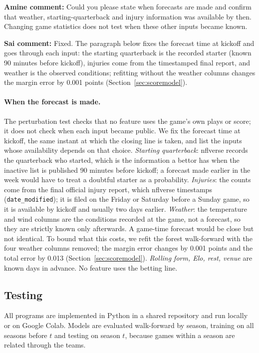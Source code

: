 {\color{red}\textbf{Amine comment:} Could you please state when forecasts are made and confirm that weather, starting-quarterback and injury information was available by then. Changing game statistics does not test when these other inputs became known.}

{\color{blue}\textbf{Sai comment:} Fixed. The paragraph below fixes the forecast time at kickoff and goes through each input: the starting quarterback is the recorded starter (known 90 minutes before kickoff), injuries come from the timestamped final report, and weather is the observed conditions; refitting without the weather columns changes the margin error by 0.001 points (Section~\ref{sec:scoremodel}).}

\paragraph{When the forecast is made.} The perturbation test checks that no feature uses the game's own plays or score; it does not check when each input became public. We fix the forecast time at kickoff, the same instant at which the closing line is taken, and list the inputs whose availability depends on that choice. \emph{Starting quarterback}: nflverse records the quarterback who started, which is the information a bettor has when the inactive list is published 90 minutes before kickoff; a forecast made earlier in the week would have to treat a doubtful starter as a probability. \emph{Injuries}: the counts come from the final official injury report, which nflverse timestamps (\texttt{date\_modified}); it is filed on the Friday or Saturday before a Sunday game, so it is available by kickoff and usually two days earlier. \emph{Weather}: the temperature and wind columns are the conditions recorded at the game, not a forecast, so they are strictly known only afterwards. A game-time forecast would be close but not identical. To bound what this costs, we refit the forest walk-forward with the four weather columns removed; the margin error changes by 0.001 points and the total error by 0.013 (Section~\ref{sec:scoremodel}). \emph{Rolling form, Elo, rest, venue} are known days in advance. No feature uses the betting line.

\subsection{Testing}

All programs are implemented in Python in a shared repository and run locally or on Google Colab. Models are evaluated walk-forward by season, training on all seasons before $t$ and testing on season $t$, because games within a season are related through the teams.
